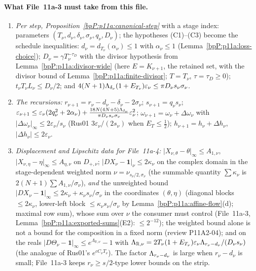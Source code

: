 \paragraph{What File~11a-3 must take from this file.}
\begin{enumerate}[label=(T\arabic*)]
\item \emph{Per step, Proposition~\ref{bpP:p11a:canonical-step}} with a stage index: parameters $(T_\nu,d_\nu,\delta_\nu,\sigma_\nu,q_\nu,D_\nu)$; the hypotheses (C1)--(C3) become the schedule inequalities: $d_\nu=d_{T_\nu}(\alpha_\nu)\le1$ with $\alpha_\nu\le1$ (Lemma~\ref{bpP:p11a:loss-choice}); $D_\nu=\gamma T_\nu^{-\tau_D}$ with the divisor hypothesis from Lemma~\ref{bpP:p11a:divisor-wide} (here $E=K_{\nu+1}$, the retained set, with the divisor bound of Lemma~\ref{bpP:p11a:finite-divisor}; $T=T_\nu$, $\tau=\tau_D\ge0$); $t_\nu T_\nu L_\nu\le D_\nu/2$; and $4(N+1)\Lambda_{\delta_\nu}(1+E_{T_\nu})\varepsilon_\nu\le\pi D_\nu s_\nu\sigma_\nu$.
\item \emph{The recursions:} $r_{\nu+1}=r_\nu-d_\nu-\delta_\nu-2\sigma_\nu$; $s_{\nu+1}=q_\nu s_\nu$; $\varepsilon_{\nu+1}\le\varepsilon_\nu(2q_\nu^2+2\alpha_\nu)+\frac{18N(4N+5)\Lambda_{\delta_\nu}}{\pi D_\nu s_\nu\sigma_\nu}\varepsilon_\nu^2$; $\omega_{\nu+1}=\omega_\nu+\Delta\omega_\nu$ with $\lvert\Delta\omega_\nu\rvert_\infty\le2\varepsilon_\nu/s_\nu$ (Rus01 $3\varepsilon_\nu/(2s_\nu)$ when $E_T\le\frac12$); $h_{\nu+1}=h_\nu+\Delta h_\nu$, $\lvert\Delta h_\nu\rvert\le2\varepsilon_\nu$.
\item \emph{Displacement and Lipschitz data for File~11a-4:} $\lvert X_{\nu,\theta}-\theta\rvert_\infty\le A_{1,\nu}$, $\lvert X_{\nu,\eta}-\eta\rvert_\infty\le A_{\eta,\nu}$ on $D_{+,\nu}$; $\lvert DX_\nu-\mathbf 1\rvert_\nu\le2\kappa_\nu$ on the complex domain in the stage-dependent weighted norm $\nu=\nu_{s_\nu/2,\sigma_\nu}$ (the summable quantity $\sum\kappa_\nu$ is $2(N+1)\sum A_{1,\nu}/\sigma_\nu$), \emph{and} the unweighted bound $\lvert DX_\nu-\mathbf 1\rvert_\infty\le2\kappa_\nu+\kappa_\nu s_\nu/\sigma_\nu$ in the coordinates $(\theta,\eta)$ (diagonal blocks $\le2\kappa_\nu$, lower-left block $\le\kappa_\nu s_\nu/\sigma_\nu$ by Lemma~\ref{bpP:p11a:affine-flow}(d); maximal row sum), whose sum over $\nu$ the consumer must control (File~11a-3, Lemma~\ref{bpP:p11a:exported-sums}(E2): $\le2^{-12}$); the weighted bound alone is not a bound for the composition in a fixed norm (review P11A2-04); and on the reals $\lvert D\Theta_\nu-\mathbf 1\rvert_\infty\le e^{\Lambda_{\mathbb R,\nu}}-1$ with $\Lambda_{\mathbb R,\nu}=2T_\nu(1+E_{T_\nu})\varepsilon_\nu\Lambda_{r_\nu-d_\nu}/(D_\nu s_\nu)$ (the analogue of Rus01's $e^{cC_\nu T_\nu}$). The factor $\Lambda_{r_\nu-d_\nu}$ is large when $r_\nu-d_\nu$ is small; File~11a-3 keeps $r_\nu\ge s/2$-type lower bounds on the strip.

\end{enumerate}
